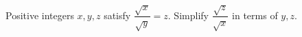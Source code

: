 Positive integers $x,y,z$ satisfy $\dfrac{\sqrt x}{\sqrt y}=z$. Simplify $\dfrac{\sqrt z}{\sqrt x}$ in terms of $y,z$.
